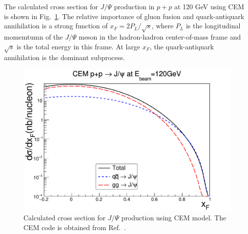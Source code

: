 The calculated cross section for $J/\Psi$ production in $p+p$ at 120 GeV using 
CEM is shown in Fig.\ \ref{fig:cem_cs}. The relative importance of gluon fusion 
and quark-antiquark annihilation is a strong function of $x_F=2P_L/\sqrt{s}$, 
where $P_L$ is the longitudinal momemtumn of the $J/\Psi$ meson in the 
hadron-hadron center-of-mass frame and $\sqrt{s}$ is the total energy in this 
frame. At large $x_F$, the quark-antiquark annihilation is the dominant subprocess.  
\begin{figure}[h!]
    \centering
    \includegraphics[width=0.45\linewidth]{images/pp_norm_cs_NLO_pp}
    \caption{Calculated cross section for $J/\Psi$ production using CEM model. 
		The CEM code is obtained from Ref.\ \cite{mangano1993}.}
    \label{fig:cem_cs}
\end{figure}

